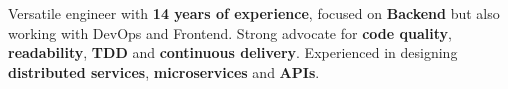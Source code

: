 \documentclass[10pt,a4paper,ragged2e,withhyper]{altacv}
\newcommand{\accentbold}[1]{\textbf{\textcolor{accent}{#1}}}
\begin{document}
\begin{paracol}{2}









\switchcolumn

%

%
%
%


Versatile engineer with \accentbold{14 years of experience}, focused on \accentbold{Backend} but also working with DevOps and Frontend. Strong advocate for \accentbold{code quality}, \accentbold{readability}, \accentbold{TDD} and \accentbold{continuous delivery}. Experienced in designing \accentbold{distributed services}, \accentbold{microservices} and \accentbold{APIs}.

\medskip


\end{paracol}
\end{document}
